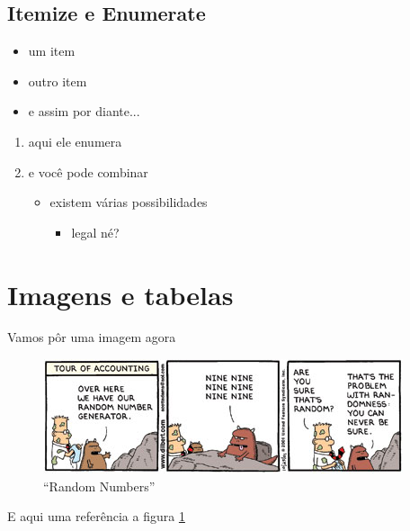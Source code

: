 \documentclass[11pt]{beamer}
\begin{document}
	\subsection{Itemize e Enumerate}
	\begin{frame}
		\begin{itemize}
			\item um item
			\item outro item
			\item e assim por diante...
		\end{itemize}
		\begin{enumerate}
			\item aqui ele enumera
			\item e você pode combinar
			\begin{itemize}
				\item existem várias possibilidades
				\begin{itemize}
					\item legal né?
				\end{itemize}
			\end{itemize}
		\end{enumerate}
	\end{frame}
	
	\section{Imagens e tabelas}
	
	\begin{frame}{Vamos pôr uma imagem agora}	
		\begin{figure}
			\centering %
			\includegraphics[width=0.5\linewidth]{random.jpg} %
			\caption{``Random Numbers'' \citep{dilbert}} %
			\label{fig:random} %
		\end{figure}		
		E aqui uma referência a figura \ref{fig:random} %
	\end{frame}
	
\end{document}
